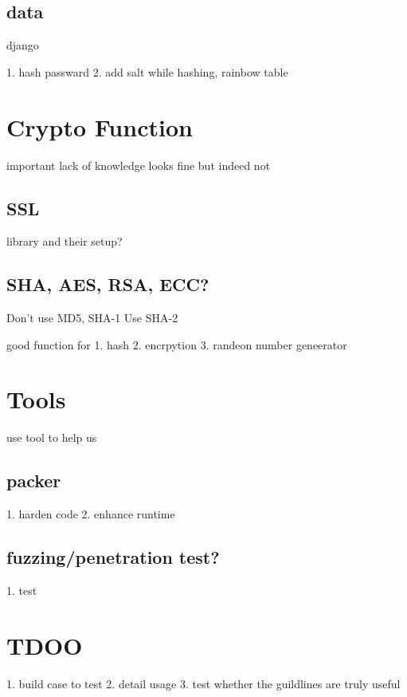 \documentclass[12pt, a4paper]{article}
\begin{document}
\subsection{data}
django

1. hash passward
2. add salt while hashing, rainbow table


%   
\section{Crypto Function}
important
lack of knowledge
looks fine but indeed not

\subsection{SSL}
library and their setup?

\subsection{SHA, AES, RSA, ECC?}

Don't use MD5, SHA-1
Use SHA-2

good function for
1. hash
2. encrpytion
3. randeon number geneerator

%   
\section{Tools}
use tool to help us
\subsection{packer}
1. harden code
2. enhance runtime
\subsection{fuzzing/penetration test?}
1. test

\section{TDOO}
1. build case to test
2. detail usage
3. test whether the guildlines are truly useful



\end{document}
